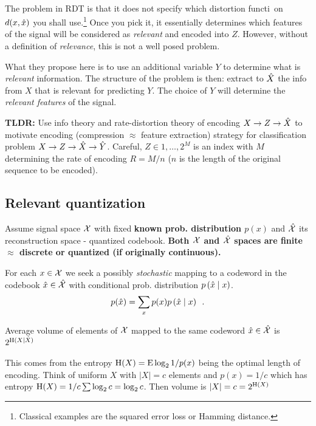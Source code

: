 \\
The problem in RDT is that it does not specify which distortion functi~on $d(x, \hat{x})$ you shall use.\footnote{Classical examples are the squared error loss or Hamming distance.}
Once you pick it, it essentially determines which features of the signal will be considered as \emph{relevant} and encoded into $Z$. 
However, without a definition of \emph{relevance}, this is not a well posed problem. 

What they propose here is to use an additional variable $Y$ to determine what is \emph{relevant} information.
The structure of the problem is then: extract to $\hat{X}$ the info from $X$ that is relevant for predicting $Y$. 
The choice of $Y$ will determine the \emph{relevant features} of the signal. 

\begin{notebox}
\textbf{TLDR:}
Use info theory and rate-distortion theory of encoding $X \to Z \to \hat{X}$ to motivate encoding (compression $\approx$ feature extraction) strategy for classification problem $X \to Z \to \hat{X} \to \hat{Y}$. Careful, $Z \in {1, \ldots, 2^M}$ is an index with $M$ determining the rate of encoding $R = M/n$ ($n$ is the length of the original sequence to be encoded). 
\end{notebox}


\subsection{Relevant quantization}

Assume signal space $\mathcal{X}$ with fixed \textbf{known prob. distribution $p(x)$} and $\hat{\mathcal{X}}$ its reconstruction space - quantized codebook.
\textbf{Both $\mathcal{X}$ and $\hat{\mathcal{X}}$ spaces are finite $\approx$ discrete or quantized (if originally continuous).}

For each $x \in \mathcal{X}$ we seek a possibly \emph{stochastic} mapping to a codeword in the codebook $\hat{x} \in \hat{\mathcal{X}}$ with conditional prob. distribution $p \left( \hat{x} \mid x \right)$.
\begin{equation}
p(\hat{x}) = \sum_x p(x) p \left( \hat{x} \mid x \right) \enspace.
\end{equation}

Average volume of elements of $\mathcal{X}$ mapped to the same codeword $\hat{x} \in \hat{\mathcal{X}}$ is $2^{\mathrm{H}(X \mid \hat{X})}$
\begin{notebox}
This comes from the entropy $\mathrm{H}(X) = \mathrm{E} \log_2 1/p(x)$ being the optimal length of encoding. Think of uniform $X$ with $\lvert X \rvert = c$ elements and $p(x) = 1/c$ which has entropy $\mathrm{H}(X) = 1/c \sum \log_2 c = \log_2 c$.
Then volume is $\lvert X \rvert = c = 2^{\mathrm{H}(X)}$
\end{notebox}

